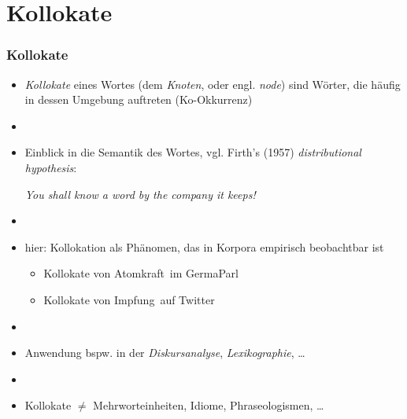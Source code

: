 \documentclass[aspectratio=1610,t]{beamer} %
\begin{document}
\section{Kollokate}
\begin{frame}
  \frametitle{Kollokate}
  \begin{itemize}
  \item \emph{Kollokate} eines Wortes (dem \emph{Knoten}, oder engl. \emph{node}) sind Wörter, die häufig in dessen Umgebung auftreten (Ko-Okkurrenz)
  \item[]
  \item Einblick in die Semantik des Wortes, vgl. Firth's (1957) \emph{distributional hypothesis}:
    \begin{center}
      \emph{You shall know a word by the company it keeps!}
    \end{center}
  \item[]
  \item hier: Kollokation als Phänomen, das in Korpora empirisch beobachtbar ist
    \begin{itemize}
    \item Kollokate von \glqq Atomkraft\grqq\ im GermaParl
    \item Kollokate von \glqq Impfung\grqq\ auf Twitter
    \end{itemize}
  \item[]
  \item Anwendung bspw. in der \emph{Diskursanalyse}, \emph{Lexikographie}, \ldots
  \item[]
  \item Kollokate $\neq$ Mehrworteinheiten, Idiome, Phraseologismen, \ldots
  \end{itemize}
\end{frame}
\end{document}
